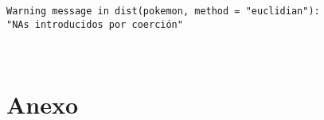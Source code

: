 \documentclass[10pt, a4paper]{article}
\begin{document}
    \begin{Verbatim}[commandchars=\\\{\}]
Warning message in dist(pokemon, method = "euclidian"):
"NAs introducidos por coerción"
    \end{Verbatim}

    \begin{center}
    \end{center}
    { \hspace*{\fill} \\}
    



\clearpage

\section{Anexo}

\renewcommand{\contentsname}{\subsection{\textbf{Índice}}}
\tableofcontents

\renewcommand{\listalgorithmcfname}{\subsection{\textbf{Algoritmos}}}
\listofalgorithms

\renewcommand{\listtablename}{\subsection{\textbf{Tablas}}}
\listoftables

\renewcommand{\listfigurename}{\subsection{\textbf{Imágenes y figuras}}}
\listoffigures
\end{document}
